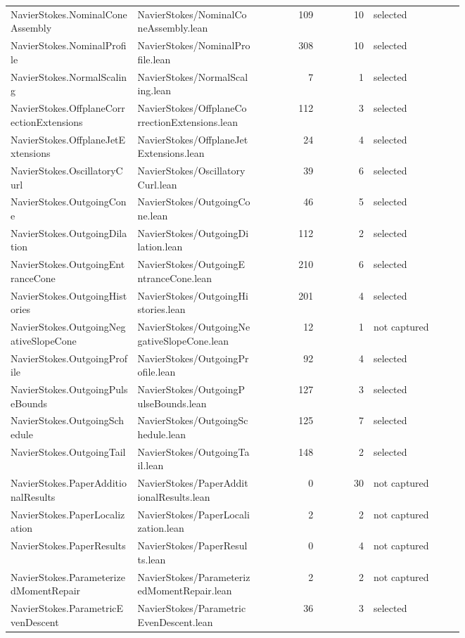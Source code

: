 \documentclass[10pt]{article}
\begin{document}
\begin{longtable}{p{0.28\linewidth}p{0.27\linewidth}r r p{0.20\linewidth}}
NavierStokes.NominalConeAssembly & NavierStokes/NominalConeAssembly.lean & 109 & 10 & selected\\
NavierStokes.NominalProfile & NavierStokes/NominalProfile.lean & 308 & 10 & selected\\
NavierStokes.NormalScaling & NavierStokes/NormalScaling.lean & 7 & 1 & selected\\
NavierStokes.OffplaneCorrectionExtensions & NavierStokes/OffplaneCorrectionExtensions.lean & 112 & 3 & selected\\
NavierStokes.OffplaneJetExtensions & NavierStokes/OffplaneJetExtensions.lean & 24 & 4 & selected\\
NavierStokes.OscillatoryCurl & NavierStokes/OscillatoryCurl.lean & 39 & 6 & selected\\
NavierStokes.OutgoingCone & NavierStokes/OutgoingCone.lean & 46 & 5 & selected\\
NavierStokes.OutgoingDilation & NavierStokes/OutgoingDilation.lean & 112 & 2 & selected\\
NavierStokes.OutgoingEntranceCone & NavierStokes/OutgoingEntranceCone.lean & 210 & 6 & selected\\
NavierStokes.OutgoingHistories & NavierStokes/OutgoingHistories.lean & 201 & 4 & selected\\
NavierStokes.OutgoingNegativeSlopeCone & NavierStokes/OutgoingNegativeSlopeCone.lean & 12 & 1 & not captured\\
NavierStokes.OutgoingProfile & NavierStokes/OutgoingProfile.lean & 92 & 4 & selected\\
NavierStokes.OutgoingPulseBounds & NavierStokes/OutgoingPulseBounds.lean & 127 & 3 & selected\\
NavierStokes.OutgoingSchedule & NavierStokes/OutgoingSchedule.lean & 125 & 7 & selected\\
NavierStokes.OutgoingTail & NavierStokes/OutgoingTail.lean & 148 & 2 & selected\\
NavierStokes.PaperAdditionalResults & NavierStokes/PaperAdditionalResults.lean & 0 & 30 & not captured\\
NavierStokes.PaperLocalization & NavierStokes/PaperLocalization.lean & 2 & 2 & not captured\\
NavierStokes.PaperResults & NavierStokes/PaperResults.lean & 0 & 4 & not captured\\
NavierStokes.ParameterizedMomentRepair & NavierStokes/ParameterizedMomentRepair.lean & 2 & 2 & not captured\\
NavierStokes.ParametricEvenDescent & NavierStokes/ParametricEvenDescent.lean & 36 & 3 & selected\\

\end{longtable}
\end{document}
